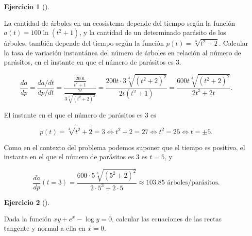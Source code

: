 \documentclass[
  spanish,
  a4paper,
]{scrreport}
\theoremstyle{definition}
\newtheorem{exercise}{Ejercicio}[chapter]
\theoremstyle{remark}
\begin{document}
\begin{exercise}[]\protect\hypertarget{exr-derivadas-parametricas-1}{}\label{exr-derivadas-parametricas-1}

La cantidad de árboles en un ecosistema depende del tiempo según la
función \(a(t)=100\ln(t^2+1)\), y la cantidad de un determinado parásito
de los árboles, también depende del tiempo según la función
\(p(t) = \sqrt[3]{t^2+ 2}\). Calcular la tasa de variación instantánea
del número de árboles en relación al número de parásitos, en el instante
en que el número de parásitos es \(3\).

\end{exercise}

\begin{tcolorbox}[enhanced jigsaw, arc=.35mm, bottomrule=.15mm, bottomtitle=1mm, breakable, colback=white, colbacktitle=quarto-callout-tip-color!10!white, colframe=quarto-callout-tip-color-frame, coltitle=black, left=2mm, leftrule=.75mm, opacityback=0, opacitybacktitle=0.6, rightrule=.15mm, title=\textcolor{quarto-callout-tip-color}{\faLightbulb}\hspace{0.5em}{Solución}, titlerule=0mm, toprule=.15mm, toptitle=1mm]

\[
\frac{da}{dp} = \frac{da/dt}{dp/dt} = \frac{\frac{200t}{t^2+1}}{\frac{2t}{3\sqrt[3]{(t^2+2)^2}}} = \frac{200t\cdot 3\sqrt[3]{(t^2+2)^2}}{2t(t^2+1)} = \frac{600t\sqrt[3]{(t^2+2)^2}}{2t^3+2t}.
\]

El instante en el que el número de parásitos es \(3\) es

\[
p(t)=\sqrt[3]{t^2+2} = 3 \Leftrightarrow t^2+2 = 27 \Leftrightarrow t^2=25 \Leftrightarrow t=\pm 5.
\]

Como en el contexto del problema podemos suponer que el tiempo es
positivo, el instante en el que el número de parásitos es \(3\) es
\(t=5\), y

\[
\frac{da}{dp} (t=3) = \frac{600\cdot 5\sqrt[3]{(5^2+2)^2}}{2\cdot 5^3+2\cdot 5} \approx 103.85 \mbox{ árboles/parásitos}.
\]

\end{tcolorbox}

\begin{exercise}[]\protect\hypertarget{exr-derivada-implicita-1}{}\label{exr-derivada-implicita-1}

Dada la función \(xy+e^x-\log y=0\), calcular las ecuaciones de las
rectas tangente y normal a ella en \(x=0\).

\end{exercise}
\end{document}
